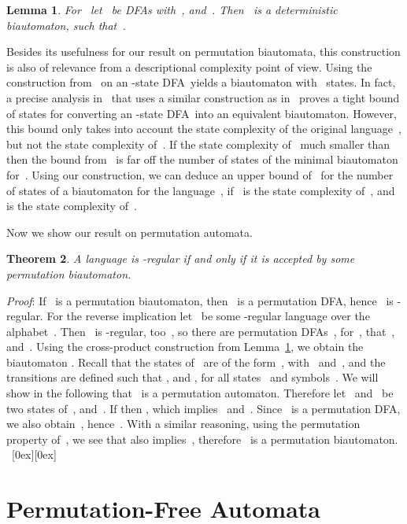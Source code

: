 \documentclass[submission]{eptcs}
\newcommand{\dfa}{\textrm{DFA}}
\newcommand*{\qed}{\raisebox{0.5ex}[0ex][0ex]{\framebox[1ex][l]{}}}
\newtheorem{theorem}{Theorem}
\newtheorem{lemma}[theorem]{Lemma}
\newenvironment{proof}{\par\noindent
  {\rmfamily\itshape\mdseries Proof\/}:\hspace{\labelsep}\ignorespaces}{\mbox{}\nolinebreak\hfill~{\qed}
  \medbreak
}
\begin{document}
\begin{lemma}\label{lem:cross-product-dbia}
  For~ let~ be
  \dfa s with~, and~.  Then~
  is a deterministic biautomaton, such that~.
\end{lemma}

Besides its usefulness for our result on permutation biautomata, this
construction is also of relevance from a descriptional complexity
point of view.
Using the construction from~\cite{KlPo12} on an -state \dfa\ yields
a biautomaton with~ states.  In fact, a precise analysis
in~\cite{JiKl12} that uses a similar construction as in~\cite{KlPo12}
proves a tight bound of  states for converting an
-state \dfa\ into an equivalent biautomaton.  However, this bound
only takes into account the state complexity of the original
language~, but not the state complexity of~.  If the state
complexity of~ much smaller than~ then the bound
from~\cite{JiKl12} is far off the number of states of the minimal
biautomaton for~.  Using our construction, we can deduce an upper
bound of~ for the number of states of a biautomaton for the
language~, if~ is the state complexity of~, and~ is the
state complexity of~.

Now we show our result on permutation automata.

\begin{theorem}
  A language is -regular if and only if it is accepted by some
  permutation biautomaton.
\end{theorem}

\begin{proof}
  If~ is a permutation biautomaton, then~ is a permutation
  \dfa, hence~ is -regular.  For the reverse implication
  let~ be some -regular language over the alphabet~.
  Then~ is -regular, too~\cite{Th68a}, so there are
  permutation \dfa s~,
  for~, that~, and~.  Using the
  cross-product construction from Lemma~\ref{lem:cross-product-dbia},
  we obtain the biautomaton .  Recall that the
  states of~ are of the form~, with~ and~, and the transitions are defined such that , and , for all
  states~ and symbols~.  We will show in the
  following that~ is a permutation automaton.  Therefore
  let~ and~ be two states of~, and~.
  If  then , which implies~
  and~.  Since~ is a permutation \dfa, we also
  obtain~, hence~.  With a similar reasoning,
  using the permutation property of~, we see that also
   implies~,
  therefore~ is a permutation biautomaton.
\end{proof}

\section{Permutation-Free Automata}
\label{sec:permutation-free}
\end{document}
